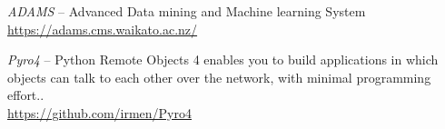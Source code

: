 %

\begin{thebibliography}{999}

		\textit{ADAMS} -- Advanced Data mining and Machine learning System \\
		\url{https://adams.cms.waikato.ac.nz/}{}

		\textit{Pyro4} -- Python Remote Objects 4 enables you to build
		applications in which objects can talk to each other over the
		network, with minimal programming effort.. \\
		\url{https://github.com/irmen/Pyro4}{}

\end{thebibliography}
